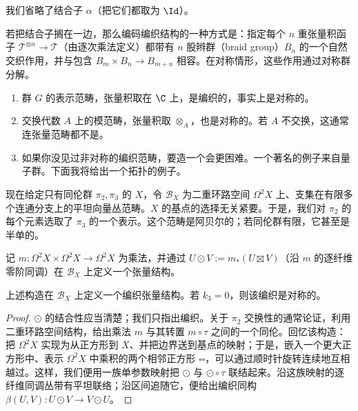 我们省略了结合子 $\alpha$（把它们都取为 $\Id$）。

\begin{remark}若把结合子搁在一边，那么编码编织结构的一种方式是：指定每个 $n$ 重张量积函子 $\mathcal{T}^{\otimes n}\to\mathcal{T}$（由逐次乘法定义）都带有 $n$ 股辫群（braid group）$B_n$ 的一个自然交织作用，并与包含 $B_m\times B_n\to B_{m+n}$ 相容。在对称情形，这些作用通过对称群分解。\end{remark}

\begin{example}
\begin{enumerate}[label=(\roman*), leftmargin=2.2em, itemsep=0.15em]
\item 群 $G$ 的表示范畴，张量积取在 $\C$ 上，是编织的，事实上是对称的。
\item 交换代数 $A$ 上的模范畴，张量积取 $\otimes_A$，也是对称的。若 $A$ 不交换，这通常连张量范畴都不是。
\item 如果你没见过非对称的编织范畴，要造一个会更困难。一个著名的例子来自量子群。下面我将给出一个拓扑的例子。
\end{enumerate}
\end{example}

现在给定只有同伦群 $\pi_2,\pi_3$ 的 $X$，令 $\mathcal{B}_X$ 为二重环路空间 $\Omega^2X$ 上、支集在有限多个连通分支上的平坦向量丛范畴。$X$ 的基点的选择无关紧要。于是，我们对 $\pi_2$ 的每个元素选取了 $\pi_3$ 的一个表示。这个范畴是阿贝尔的；若同伦群有限，它甚至是半单的。

记 $m\colon\Omega^2X\times\Omega^2X\to\Omega^2X$ 为乘法，并通过 $U\odot V:=m_*(U\boxtimes V)$（沿 $m$ 的逐纤维零阶同调）在 $\mathcal{B}_X$ 上定义一个张量结构。

\begin{proposition}上述构造在 $\mathcal{B}_X$ 上定义一个编织张量结构。若 $k_3=0$，则该编织是对称的。\end{proposition}

\begin{proof}$\odot$ 的结合性应当清楚；我们只指出编织。关于 $\pi_2$ 交换性的通常论证，利用二重环路空间结构，给出乘法 $m$ 与其转置 $m\circ\tau$ 之间的一个同伦。回忆该构造：把 $\Omega^2X$ 实现为从正方形到 $X$、并把边界送到基点的映射；于是，嵌入一个更大正方形中、表示 $\Omega^2X$ 中乘积的两个相邻正方形 $\square\square$，可以通过顺时针旋转连续地互相越过。这样，我们便用一族单参数映射把 $\odot$ 与 $\odot\circ\tau$ 联结起来。沿这族映射的逐纤维同调丛带有平坦联络；沿区间追随它，便给出编织同构 $\beta(U,V)\colon U\odot V\to V\odot U$。\end{proof}

